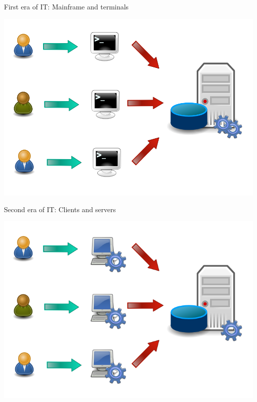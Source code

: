 {  \begin{frame}{First era of IT: Mainframe and terminals}
    \begin{center}
      \includegraphics[scale=0.3]{img/mainframe-terminals.png}
    \end{center}
  \end{frame}

  \begin{frame}{Second era of IT: Clients and servers}
    \begin{center}
      \includegraphics[scale=0.3]{img/fat-clients.png}
    \end{center}
  \end{frame}

}
